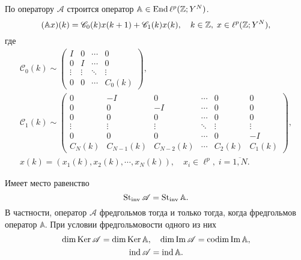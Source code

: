 \documentclass{beamer}
\begin{document}
\begin{frame}
По оператору $\mathcal A$ строится оператор $\mathbb A \in \operatorname{End} \ell^p(\mathbb{Z}; Y^N)$.
\begin{equation*}
(\mathbb A x)(k) = \mathcal C_0(k) x(k + 1) + \mathcal C_1(k) x(k) , \quad k \in \mathbb{Z}, \; x \in \ell^p(\mathbb{Z}; Y^N),
\end{equation*}
где
\begin{gather*}
   \mathcal C_0(k) \sim \begin{pmatrix}
    I & 0 & \cdots &  0 \\
    0 & I  & \cdots &  0 \\
    \vdots & \vdots & \ddots &  \vdots \\
    0 & 0 & \cdots &  C_0(k)
   \end{pmatrix},\\
   \mathcal C_1(k) \sim \begin{pmatrix}
    0 & -I & 0  & \cdots & 0 & 0 \\
    0 & 0  & -I & \cdots & 0 & 0 \\
    0 & 0  & 0 & \cdots & 0 & 0 \\
    \vdots & \vdots & \vdots & \ddots & \vdots & \vdots \\
    0 & 0 & 0 & \cdots & 0 & -I \\
    C_N(k) & C_{N-1}(k) & C_{N-2}(k) & \cdots & C_2(k) & C_1(k)
   \end{pmatrix},\\[0.5em]
   x(k) = (x_1(k), x_2(k), \cdots, x_N(k)), \quad x_i \in \ell^p, \; i = \overline{1,N}.
\end{gather*}
\end{frame}

\begin{frame}
\begin{theorem}
    Имеет место равенство
    \[ \operatorname{St_{inv}} \mathcal A = \operatorname{St_{inv}} \mathbb A. \]
    В частности, оператор $\mathcal A$ фредгольмов тогда и только тогда, когда фредгольмов оператор $\mathbb A$. При условии фредгольмовости одного из них
    \begin{gather*}
    \dim \operatorname{Ker} \mathcal A = \dim \operatorname{Ker} \mathbb A, \quad \dim \operatorname{Im} \mathcal A = \operatorname{codim} \operatorname{Im} \mathbb A, \\
    \operatorname{ind} \mathcal A = \operatorname{ind} \mathbb A.
    \end{gather*}
\end{theorem}
\end{frame}
\end{document}
